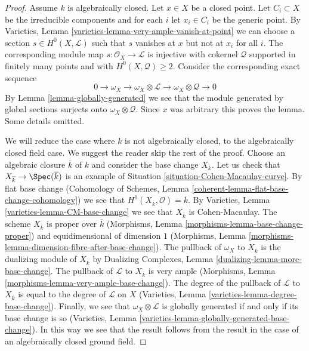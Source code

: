 \begin{proof}
Assume $k$ is algebraically closed. Let $x \in X$ be a closed point.
Let $C_i \subset X$ be the irreducible components and for each $i$
let $x_i \in C_i$ be the generic point. By
Varieties, Lemma \ref{varieties-lemma-very-ample-vanish-at-point}
we can choose a section $s \in H^0(X, \mathcal{L})$ such that $s$
vanishes at $x$ but not at $x_i$ for all $i$. The corresponding
module map $s : \mathcal{O}_X \to \mathcal{L}$ is injective with
cokernel $\mathcal{Q}$ supported in finitely many points and
with $H^0(X, \mathcal{Q}) \geq 2$. Consider the corresponding
exact sequence
$$
0 \to \omega_X \to \omega_X \otimes \mathcal{L} \to
\omega_X \otimes \mathcal{Q} \to 0
$$
By Lemma \ref{lemma-globally-generated} we see that the module generated
by global sections surjects onto $\omega_X \otimes \mathcal{Q}$.
Since $x$ was arbitrary this proves the lemma. Some details omitted.

\medskip\noindent
We will reduce the case where $k$ is not algebraically closed, to
the algebraically closed field case. We suggest the reader skip
the rest of the proof. Choose an algebraic closure $\overline{k}$
of $k$ and consider the base change $X_{\overline{k}}$. Let us
check that $X_{\overline{k}} \to \Spec(\overline{k})$ is an example
of Situation \ref{situation-Cohen-Macaulay-curve}. By flat base change
(Cohomology of Schemes, Lemma \ref{coherent-lemma-flat-base-change-cohomology})
we see that $H^0(X_{\overline{k}}, \mathcal{O}) = \overline{k}$.
By Varieties, Lemma \ref{varieties-lemma-CM-base-change}
we see that $X_{\overline{k}}$ is Cohen-Macaulay. The scheme
$X_{\overline{k}}$ is proper over $\overline{k}$ (Morphisms,
Lemma \ref{morphisms-lemma-base-change-proper}) and
equidimensional of dimension $1$
(Morphisms, Lemma \ref{morphisms-lemma-dimension-fibre-after-base-change}).
The pullback of $\omega_X$ to $X_{\overline{k}}$ is the dualizing
module of $X_{\overline{k}}$ by
Dualizing Complexes, Lemma \ref{dualizing-lemma-more-base-change}.
The pullback of $\mathcal{L}$ to $X_{\overline{k}}$ is very ample
(Morphisms, Lemma \ref{morphisms-lemma-very-ample-base-change}).
The degree of the pullback of $\mathcal{L}$ to $X_{\overline{k}}$
is equal to the degree of $\mathcal{L}$ on $X$ (Varieties, Lemma
\ref{varieties-lemma-degree-base-change}). Finally, we see that
$\omega_X \otimes \mathcal{L}$ is globally generated if and only
if its base change is so
(Varieties, Lemma \ref{varieties-lemma-globally-generated-base-change}).
In this way we see that the result follows from the result in the
case of an algebraically closed ground field.
\end{proof}





